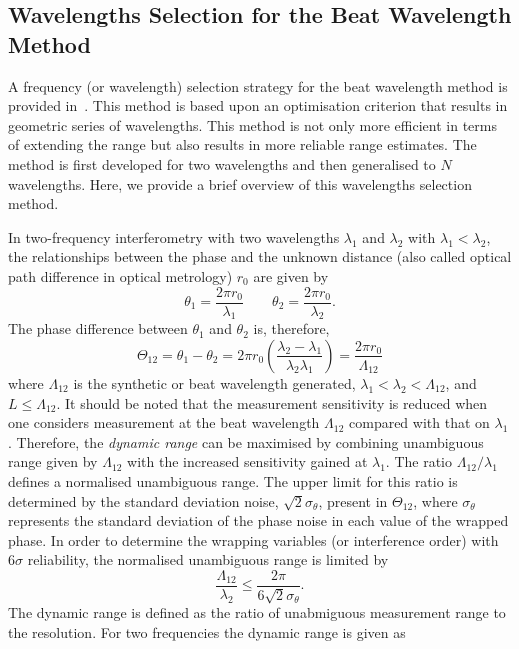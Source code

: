 \subsection{Wavelengths Selection for the Beat Wavelength Method}
A frequency (or wavelength) selection strategy for the beat wavelength method is provided in~\cite{Towers_frequency_selection_interferometry_2003}. This method is based upon an optimisation criterion that results in geometric series of wavelengths. This method is not only more efficient in terms of extending the range but also results in more reliable range estimates. The method is first developed for two wavelengths and then generalised to $N$ wavelengths. Here, we provide a brief overview of this wavelengths selection method.

In two-frequency interferometry with two wavelengths $\lambda_1$ and $\lambda_2$ with $\lambda_1 < \lambda_2$, the relationships between the phase and the unknown distance (also called optical path difference in optical metrology) $r_0$ are given by
\[
\theta_1 = \frac{2\pi r_0}{\lambda_1} \qquad \theta_2 = \frac{2\pi r_0}{\lambda_2}.
\]
The phase difference between $\theta_1$ and $\theta_2$ is, therefore,
\[
\Theta_{12} = \theta_1 - \theta_2 = 2\pi r_0 \left(  \frac{\lambda_2 - \lambda_1}{\lambda_2\lambda_1}   \right)= \frac{2\pi r_0}{\Lambda_{12}}
\]
where $\Lambda_{12}$ is the synthetic or beat wavelength generated, $\lambda_1 < \lambda_2 <\Lambda_{12}$, and $L \leq \Lambda_{12}$. It should be noted that the measurement sensitivity is reduced when one considers measurement at the beat wavelength $\Lambda_{12}$ compared with that on $\lambda_1$. Therefore, the \emph{dynamic range} can be maximised by combining unambiguous range given by $\Lambda_{12}$ with the increased sensitivity gained at $\lambda_1$. The ratio $\Lambda_{12}/\lambda_1$ defines a normalised unambiguous range. The upper limit for this ratio is determined by the standard deviation noise, $\sqrt{2}\sigma_{\theta}$, present in $\Theta_{12}$, where $\sigma_{\theta}$ represents the standard deviation of the phase noise in each value of the wrapped phase. In order to determine the wrapping variables (or interference order) with $6\sigma$ reliability, the normalised unambiguous range is limited by~\cite{Towers_frequency_selection_interferometry_2003}
\begin{equation}\label{norml-range-2-freq}
\frac{\Lambda_{12}}{\lambda_2} \leq \dfrac{2 \pi}{6\sqrt{2}\sigma_{\theta}}.
\end{equation}
The dynamic range is defined as the ratio of unabmiguous measurement range to the resolution. For two frequencies the dynamic range is given as~\cite{Towers_frequency_selection_interferometry_2003}
